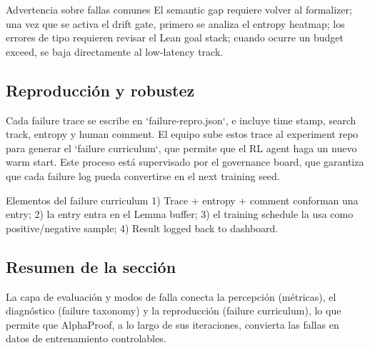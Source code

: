 \begin{warningbox}{Advertencia sobre fallas comunes}
El semantic gap requiere volver al formalizer; una vez que se activa el drift gate, primero se analiza el entropy heatmap; los errores de tipo requieren revisar el Lean goal stack; cuando ocurre un budget exceed, se baja directamente al low-latency track.
\end{warningbox}

\subsection{Reproducción y robustez}
Cada failure trace se escribe en `failure-repro.json`, e incluye time stamp, search track, entropy y human comment. El equipo sube estos trace al experiment repo para generar el `failure curriculum`, que permite que el RL agent haga un nuevo warm start. Este proceso está supervisado por el governance board, que garantiza que cada failure log pueda convertirse en el next training seed.

\begin{knowledgebox}{Elementos del failure curriculum}
1) Trace + entropy + comment conforman una entry; 2) la entry entra en el Lemma buffer; 3) el training schedule la usa como positive/negative sample; 4) Result logged back to dashboard.
\end{knowledgebox}

\subsection{Resumen de la sección}
La capa de evaluación y modos de falla conecta la percepción (métricas), el diagnóstico (failure taxonomy) y la reproducción (failure curriculum), lo que permite que AlphaProof, a lo largo de sus iteraciones, convierta las fallas en datos de entrenamiento controlables.
\newpage

